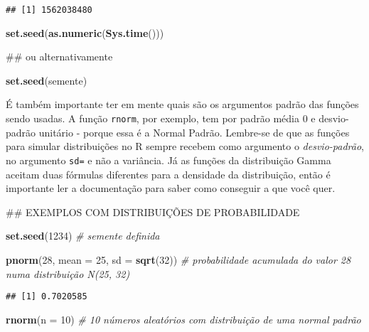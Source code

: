 \documentclass[]{article}
\newenvironment{Shaded}{\begin{snugshade}}{\end{snugshade}}
\newcommand{\KeywordTok}[1]{\textcolor[rgb]{0.13,0.29,0.53}{\textbf{#1}}}
\newcommand{\DataTypeTok}[1]{\textcolor[rgb]{0.13,0.29,0.53}{#1}}
\newcommand{\DecValTok}[1]{\textcolor[rgb]{0.00,0.00,0.81}{#1}}
\newcommand{\CommentTok}[1]{\textcolor[rgb]{0.56,0.35,0.01}{\textit{#1}}}
\newcommand{\NormalTok}[1]{#1}
\begin{document}
\begin{verbatim}
## [1] 1562038480
\end{verbatim}

\begin{Shaded}
\begin{Highlighting}[]
\KeywordTok{set.seed}\NormalTok{(}\KeywordTok{as.numeric}\NormalTok{(}\KeywordTok{Sys.time}\NormalTok{()))}

\NormalTok{## ou alternativamente}

\KeywordTok{set.seed}\NormalTok{(semente)}
\end{Highlighting}
\end{Shaded}

É também importante ter em mente quais são os argumentos padrão das
funções sendo usadas. A função \texttt{rnorm}, por exemplo, tem por
padrão média 0 e desvio-padrão unitário - porque essa é a Normal Padrão.
Lembre-se de que as funções para simular distribuições no R sempre
recebem como argumento o \emph{desvio-padrão}, no argumento \texttt{sd=}
e não a variância. Já as funções da distribuição Gamma aceitam duas
fórmulas diferentes para a densidade da distribuição, então é importante
ler a documentação para saber como conseguir a que você quer.

\begin{Shaded}
\begin{Highlighting}[]
\NormalTok{## EXEMPLOS COM DISTRIBUIÇÕES DE PROBABILIDADE}

\KeywordTok{set.seed}\NormalTok{(}\DecValTok{1234}\NormalTok{) }\CommentTok{# semente definida}

\KeywordTok{pnorm}\NormalTok{(}\DecValTok{28}\NormalTok{, }\DataTypeTok{mean =} \DecValTok{25}\NormalTok{, }\DataTypeTok{sd =} \KeywordTok{sqrt}\NormalTok{(}\DecValTok{32}\NormalTok{)) }\CommentTok{# probabilidade acumulada do valor 28 numa distribuição N(25, 32)}
\end{Highlighting}
\end{Shaded}

\begin{verbatim}
## [1] 0.7020585
\end{verbatim}

\begin{Shaded}
\begin{Highlighting}[]
\KeywordTok{rnorm}\NormalTok{(}\DataTypeTok{n =} \DecValTok{10}\NormalTok{) }\CommentTok{# 10 números aleatórios com distribuição de uma normal padrão}
\end{Highlighting}
\end{Shaded}
\end{document}
